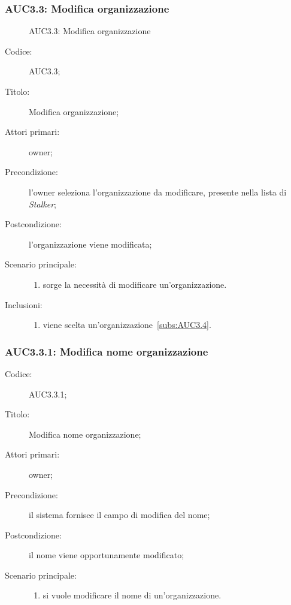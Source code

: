 \documentclass[../../../analisi-dei-requisiti.tex]{subfiles}
\begin{document}
\subsubsection{AUC3.3: Modifica organizzazione}%
\label{subs:AUC3.3}

\begin{figure}[H]
  \centering
  \caption{AUC3.3: Modifica organizzazione}%
  \label{fig:AUC3_3}
\end{figure}

\begin{description}
  \item[Codice:] AUC3.3;
  \item[Titolo:] Modifica organizzazione;
  \item[Attori primari:] owner;
  \item[Precondizione:] l'owner seleziona l'organizzazione da modificare, presente nella lista di \emph{Stalker};
  \item[Postcondizione:] l'organizzazione viene modificata;
  \item[Scenario principale:]
        \begin{enumerate}
          \item sorge la necessità di modificare un'organizzazione.
        \end{enumerate}
  \item[Inclusioni:]
        \begin{enumerate}
          \item viene scelta un'organizzazione~\ref{subs:AUC3.4}.
        \end{enumerate}
\end{description}

\subsubsection{AUC3.3.1: Modifica nome organizzazione}%
\label{subs:AUC3.3.1}
\begin{description}
  \item[Codice:] AUC3.3.1;
  \item[Titolo:] Modifica nome organizzazione;
  \item[Attori primari:] owner;
  \item[Precondizione:] il sistema fornisce il campo di modifica del nome;
  \item[Postcondizione:] il nome viene opportunamente modificato;
  \item[Scenario principale:]
        \begin{enumerate}
          \item si vuole modificare il nome di un'organizzazione.
        \end{enumerate}
\end{description}
\end{document}
